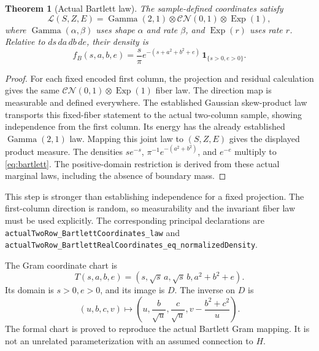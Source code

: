 \documentclass[11pt]{article}
\newtheorem{theorem}{Theorem}[section]
\newcommand{\CN}{\mathcal{CN}}
\newcommand{\Law}{\mathcal L}
\newcommand{\lean}[1]{{\small\nolinkurl{#1}}}
\begin{document}
\begin{theorem}[Actual Bartlett law]\label{thm:bartlett}
The sample-defined coordinates satisfy
\[
 \Law(S,Z,E)=\operatorname{Gamma}(2,1)\otimes\CN(0,1)
                       \otimes\operatorname{Exp}(1),
\]
where $\operatorname{Gamma}(\alpha,\beta)$ uses shape $\alpha$ and rate $\beta$,
and $\operatorname{Exp}(r)$ uses rate $r$. Relative to
$ds\,da\,db\,de$, their density is
\begin{equation}\label{eq:bartlett}
 f_B(s,a,b,e)=\frac{s}{\pi}
           e^{-(s+a^2+b^2+e)}\,\mathbf1_{\{s>0,e>0\}}.
\end{equation}
\end{theorem}
\begin{proof}
For each fixed encoded first column, the projection and residual calculation
gives the same $\CN(0,1)\otimes\operatorname{Exp}(1)$ fiber law.
The direction map is measurable and defined everywhere. The established
Gaussian skew-product law transports this fixed-fiber statement to the actual
two-column sample, showing independence from the first column. Its energy
has the already established $\operatorname{Gamma}(2,1)$ law. Mapping this joint
law to $(S,Z,E)$ gives the displayed product measure.
The densities $s e^{-s}$, $\pi^{-1}e^{-(a^2+b^2)}$, and $e^{-e}$ multiply to
\eqref{eq:bartlett}. The positive-domain restriction is derived from these
actual marginal laws, including the absence of boundary mass.
\end{proof}

This step is stronger than establishing independence for a fixed projection.
The first-column direction is random, so measurability and the invariant fiber
law must be used explicitly. The corresponding principal declarations are
\lean{actualTwoRow_BartlettCoordinates_law} and
\lean{actualTwoRow_BartlettRealCoordinates_eq_normalizedDensity}.

The Gram coordinate chart is
\begin{equation}\label{eq:chart}
 T(s,a,b,e)=(s,\sqrt{s}\,a,\sqrt{s}\,b,a^2+b^2+e).
\end{equation}
Its domain is $s>0,e>0$, and its image is $D$. The inverse on $D$ is
\[
 (u,b,c,v)\longmapsto
 \left(u,\frac b{\sqrt u},\frac c{\sqrt u},
             v-\frac{b^2+c^2}{u}\right).
\]
The formal chart is proved to reproduce the actual Bartlett Gram mapping.
It is not an unrelated parameterization with an assumed connection to $H$.
\end{document}
